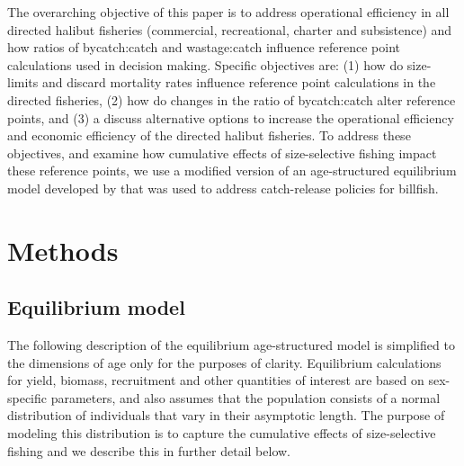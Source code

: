 \documentclass[12pt,leqno]{article}
\begin{document}
The overarching objective of this paper is to address operational efficiency in all directed halibut fisheries (commercial, recreational, charter and subsistence) and how ratios of bycatch:catch and wastage:catch influence reference point calculations used in decision making. Specific objectives are: (1) how do size-limits and discard mortality rates influence reference point calculations in the directed fisheries, (2) how do changes in the ratio of bycatch:catch alter reference points, and (3) a discuss alternative options to increase the operational efficiency and economic efficiency of the directed halibut fisheries.  To address these objectives, and examine how cumulative effects of size-selective fishing impact these reference points, we use a modified version of an age-structured equilibrium model developed by \cite{pineiii2008car} that was used to address catch-release policies for billfish.


%
%
\section*{Methods}
\label{sec:methods}

\subsection*{Equilibrium model} %
\label{sub:equilibrium_model}
The following description of the equilibrium age-structured model is simplified to the dimensions of age only for the purposes of clarity.  Equilibrium calculations for yield, biomass, recruitment and other quantities of interest are based on sex-specific parameters, and also assumes that the population consists of a normal distribution of individuals that vary in their asymptotic length.  The purpose of modeling this distribution is to capture the cumulative effects of size-selective fishing and we describe this in further detail below.
\end{document}
